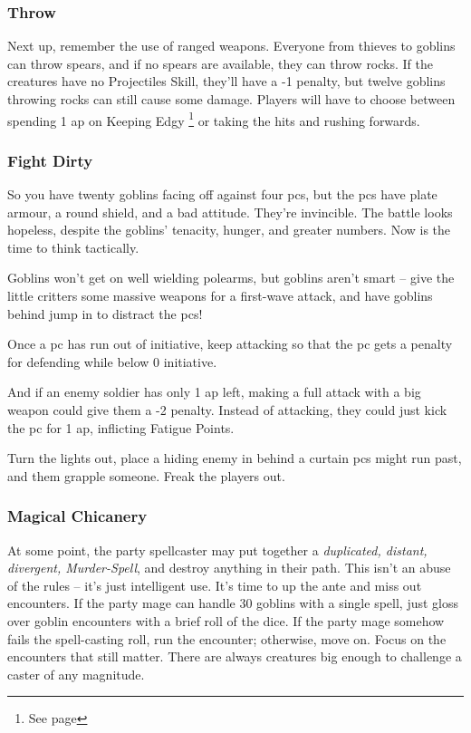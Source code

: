 \begin{multicols}{2}
\subsubsection{Throw}

Next up, remember the use of ranged weapons.
Everyone from thieves to goblins can throw spears, and if no spears are available, they can throw rocks.
If the creatures have no Projectiles Skill, they'll have a -1 penalty, but twelve goblins throwing rocks can still cause some damage.
Players will have to choose between spending 1 \gls{ap} on Keeping Edgy%
\footnote{See page \pageref{edgy}}
 or taking the hits and rushing forwards.

\subsubsection{Fight Dirty}

So you have twenty goblins facing off against four \glspl{pc}, but the \glspl{pc} have plate armour, a round shield, and a bad attitude.
They're invincible.
The battle looks hopeless, despite the goblins' tenacity, hunger, and greater numbers.
Now is the time to think tactically.

Goblins won't get on well wielding polearms, but goblins aren't smart -- give the little critters some massive weapons for a first-wave attack, and have goblins behind jump in to distract the \glspl{pc}!

Once a \gls{pc} has run out of initiative, keep attacking so that the \gls{pc} gets a penalty for defending while below 0 initiative.

And if an enemy soldier has only 1 \gls{ap} left, making a full attack with a big weapon could give them a -2 penalty.
Instead of attacking, they could just kick the \gls{pc} for 1 \gls{ap}, inflicting Fatigue Points.

Turn the lights out, place a hiding enemy in behind a curtain \glspl{pc} might run past, and them grapple someone.
Freak the players out.

\subsubsection{Magical Chicanery}

At some point, the party spellcaster may put together a \textit{duplicated, distant, divergent, Murder-Spell}, and destroy anything in their path.
This isn't an abuse of the rules -- it's just intelligent use.
It's time to up the ante and miss out encounters.
If the party mage can handle 30 goblins with a single spell, just gloss over goblin encounters with a brief roll of the dice.
If the party mage somehow fails the spell-casting roll, run the encounter; otherwise, move on.
Focus on the encounters that still matter.
There are always creatures big enough to challenge a caster of any magnitude.


\end{multicols}
